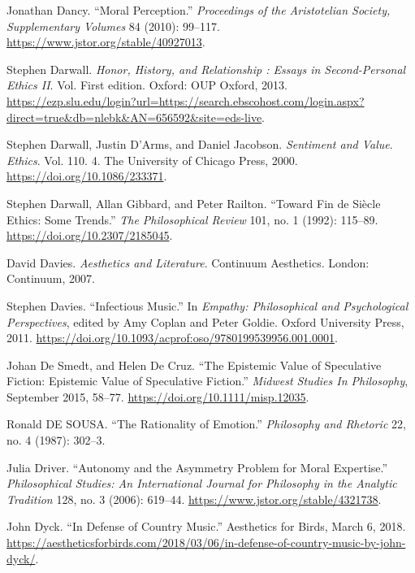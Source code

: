 \documentclass[phdthesis,12pt,final,a4paper]{wuthesis}
\newlength{\cslhangindent}
\newenvironment{CSLReferences}[2] %
{\begin{list}{}{%
	\setlength{\itemindent}{0pt}
	\setlength{\leftmargin}{0pt}
	\setlength{\parsep}{0pt}
	\ifodd #1
	\setlength{\leftmargin}{\cslhangindent}
	\setlength{\itemindent}{-1\cslhangindent}
	\fi
	\setlength{\itemsep}{#2\baselineskip}}}
{\end{list}}
\theoremstyle{definition}
\theoremstyle{definition}
\theoremstyle{definition}
\theoremstyle{definition}
\theoremstyle{remark}
\begin{document}
\begin{CSLReferences}{1}{0}
Jonathan Dancy. {``Moral {Perception}.''} \emph{Proceedings of the Aristotelian Society, Supplementary Volumes} 84 (2010): 99--117. \url{https://www.jstor.org/stable/40927013}.

Stephen Darwall. \emph{Honor, {History}, and {Relationship} : {Essays} in {Second-Personal Ethics II}}. Vol. First edition. Oxford: OUP Oxford, 2013. \url{https://ezp.slu.edu/login?url=https://search.ebscohost.com/login.aspx?direct=true&db=nlebk&AN=656592&site=eds-live}.

Stephen Darwall, Justin D'Arms, and Daniel Jacobson. \emph{Sentiment and {Value}}. \emph{Ethics}. Vol. 110. 4. The University of Chicago Press, 2000. \url{https://doi.org/10.1086/233371}.

Stephen Darwall, Allan Gibbard, and Peter Railton. {``Toward Fin de Siècle Ethics: Some Trends.''} \emph{The Philosophical Review} 101, no. 1 (1992): 115--89. \url{https://doi.org/10.2307/2185045}.

David Davies. \emph{Aesthetics and Literature}. Continuum Aesthetics. London: Continuum, 2007.

Stephen Davies. {``Infectious {Music}.''} In \emph{Empathy: {Philosophical} and {Psychological Perspectives}}, edited by Amy Coplan and Peter Goldie. Oxford University Press, 2011. \url{https://doi.org/10.1093/acprof:oso/9780199539956.001.0001}.

Johan De Smedt, and Helen De Cruz. {``The Epistemic Value of Speculative Fiction: Epistemic Value of Speculative Fiction.''} \emph{Midwest Studies In Philosophy}, September 2015, 58--77. \url{https://doi.org/10.1111/misp.12035}.

Ronald DE SOUSA. {``The {Rationality} of {Emotion}.''} \emph{Philosophy and Rhetoric} 22, no. 4 (1987): 302--3.

Julia Driver. {``Autonomy and the {Asymmetry Problem} for {Moral Expertise}.''} \emph{Philosophical Studies: An International Journal for Philosophy in the Analytic Tradition} 128, no. 3 (2006): 619--44. \url{https://www.jstor.org/stable/4321738}.

John Dyck. {``In Defense of Country Music.''} Aesthetics for Birds, March 6, 2018. \url{https://aestheticsforbirds.com/2018/03/06/in-defense-of-country-music-by-john-dyck/}.


\end{CSLReferences}
\end{document}
